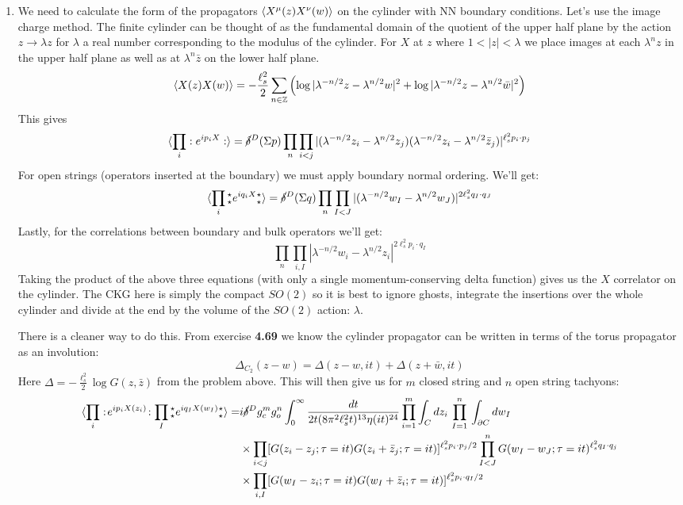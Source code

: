 \documentclass[11pt, class=article, crop=false]{standalone}
\begin{document}
\begin{enumerate}
	\item
	We need to calculate the form of the propagators $\braket{X^\mu(z) X^\nu(w)}$ on the cylinder with NN boundary conditions. Let's use the image charge method. The finite cylinder can be thought of as the fundamental domain of the quotient of the upper half plane by the action $z \to \lambda z$ for $\lambda$ a real number corresponding to the modulus of the cylinder. For $X$ at $z$ where $1<|z|<\lambda$ we place images at each $\lambda^n z$ in the upper half plane as well as at $\lambda^n \bar z$ on the lower half plane. 
	\[
		\braket{X(z) X(w)} = - \frac{\ell_s^2}{2} \sum_{n \in \mathbb{Z}} \left( \log|\lambda^{-n/2} z - \lambda^{n/2} w|^2 +  \log|\lambda^{-n/2} z - \lambda^{n/2} \bar w|^2 \right)
	\]
	This gives
	\[
		\braket{\prod_{i} :e^{i p_i X}:} = \cancel\delta^D(\Sigma p) \prod_{n} \prod_{i < j} |(\lambda^{-n/2} z_i - \lambda^{n/2} z_j) (\lambda^{-n/2} z_i - \lambda^{n/2} \bar z_j)|^{\ell_s^2 p_i \cdot p_j}
	\]
	For open strings (operators inserted at the boundary) we must apply boundary normal ordering. We'll get:
	\[
		\braket{\prod_{i} {_\star^\star} e^{i q_i X} {^\star_\star} } = \cancel\delta^D(\Sigma q) \prod_{n} \prod_{I < J} |(\lambda^{-n/2} w_I - \lambda^{n/2} w_J)|^{2 \ell_s^2 q_I \cdot q_J}
	\]	
	Lastly, for the correlations between boundary and bulk operators we'll get:
	\[
		\prod_n \prod_{i, I} |\lambda^{-n/2} w_i - \lambda^{n/2} z_i|^{2 \ell_s^2 p_i \cdot q_I}
	\]
	Taking the product of the above three equations (with only a single momentum-conserving delta function) gives us the $X$ correlator on the cylinder. The CKG here is simply the compact $SO(2)$ so it is best to ignore ghosts, integrate the insertions over the whole cylinder and divide at the end by the volume of the $SO(2)$ action: $\lambda$. 
	
	There is a cleaner way to do this. From exercise \textbf{4.69} we know the cylinder propagator can be written in terms of the torus propagator as an involution:
	\[
		\Delta_{C_2}(z- w) = \Delta(z - w, i t) + \Delta(z + \bar w, i t)
	\]
	Here $\Delta = -\frac{\ell_s^2}{2} \log G(z, \bar z)$ from the problem above. This will then give us for $m$ closed string and $n$ open string tachyons:
	\[
	\begin{aligned}
		\braket{\prod_{i} :\!e^{i p_i X(z_i)}\!: \prod_{I} {_\star^\star} e^{i q_I X(w_I)} {^\star_\star} } = & i \cancel\delta^D g_c^m g_o^n \int_0^\infty \frac{dt}{2t (8 \pi^2 \ell_s^2 t)^{13} \eta(it)^{24}} \prod_{i=1}^m \int_{C} dz_i \, \prod_{I=1}^n \, \int_{\partial C} dw_I  \\
		& \times \prod_{i<j} [G(z_i-z_j; \tau = it) G(z_i + \bar z_j; \tau = it)]^{\ell_s^2 p_i \cdot p_j/2}  \prod_{I<J}^n G(w_I-w_J; \tau = it)^{\ell_s^2 q_I \cdot q_j}\\
		& \times \prod_{i, I} [G(w_I - z_i; \tau = it) G(w_I + \bar z_i; \tau = i t)]^{\ell_s^2 p_i \cdot q_I/2}
	\end{aligned}
	\]
	

\end{enumerate}
\end{document}

